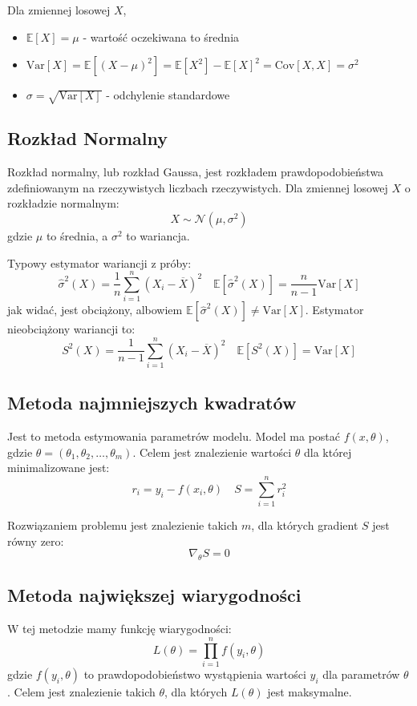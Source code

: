 \documentclass{../notatki}
\begin{document}
Dla zmiennej losowej $X$,
\begin{itemize}
  \item $\mathbb{E}[X] = \mu$ - wartość oczekiwana to średnia
  \item $\textrm{Var}[X] = \mathbb{E}[(X - \mu)^2] = \mathbb{E}[X^2]
    - \mathbb{E}[X]^2 = \textrm{Cov}[X, X] = \sigma^2$
  \item $\sigma = \sqrt{\textrm{Var}[X]}$ - odchylenie standardowe
\end{itemize}

\subsection{Rozkład Normalny}

Rozkład normalny, lub rozkład Gaussa, jest rozkładem prawdopodobieństwa
zdefiniowanym na rzeczywistych liczbach rzeczywistych. Dla zmiennej losowej
$X$ o rozkładzie normalnym:
$$
X \sim \mathcal{N}(\mu, \sigma^2)
$$
gdzie $\mu$ to średnia, a $\sigma^2$ to wariancja.

Typowy estymator wariancji z próby:
$$
\hat{\sigma}^2(X) = \frac{1}{n} \sum_{i=1}^n (X_i - \overline{X})^2
\quad \mathbb{E}[\hat{\sigma}^2(X)] = \frac{n}{n-1} \textrm{Var}[X]
$$
jak widać, jest obciążony, albowiem $\mathbb{E}[\hat{\sigma}^2(X)]
\neq \textrm{Var}[X]$. Estymator nieobciążony wariancji to:
$$
S^2(X) = \frac{1}{n - 1} \sum_{i=1}^n (X_i - \overline{X})^2
\quad \mathbb{E}[S^2(X)] = \textrm{Var}[X]
$$

\subsection{Metoda najmniejszych kwadratów}

Jest to metoda estymowania parametrów modelu. Model ma postać $f(x, \theta)$,
gdzie $\theta = (\theta_1, \theta_2, \dots, \theta_m)$. Celem jest znalezienie
wartości $\theta$ dla której minimalizowane jest:
$$
r_i = y_i - f(x_i, \theta) \quad S = \sum_{i=1}^n r_i^2
$$

Rozwiązaniem problemu jest znalezienie takich $m$, dla których
gradient $S$ jest równy zero:
$$
\nabla_\theta S = 0
$$

\subsection{Metoda największej wiarygodności}

W tej metodzie mamy funkcję wiarygodności:
$$
L(\theta) = \prod_{i=1}^n f(y_i, \theta)
$$
gdzie $f(y_i, \theta)$ to prawdopodobieństwo wystąpienia wartości $y_i$ dla
parametrów $\theta$. Celem jest znalezienie takich $\theta$, dla których
$L(\theta)$ jest maksymalne.
\end{document}
